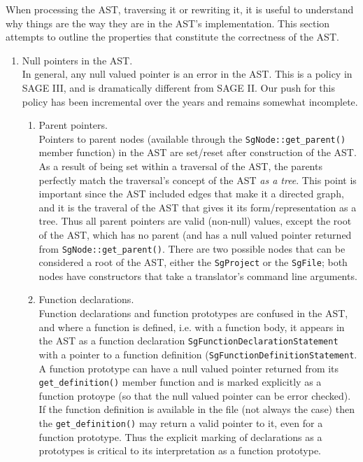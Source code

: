    When processing the AST, traversing it or rewriting it, it is useful to understand
why things are the way they are in the AST's implementation.  This section attempts to 
outline the properties that constitute the correctness of the AST.
\begin{enumerate}
     \item Null pointers in the AST. \\
          In general, any null valued pointer is an error in the AST.  This is 
          a policy in SAGE III, and is dramatically different from SAGE II.
          Our push for this policy has been incremental over the years and remains
          somewhat incomplete.
     \begin{enumerate}
          \item Parent pointers. \\
               Pointers to parent nodes (available through the {\tt SgNode::get\_parent()} member
               function) in the AST are set/reset after construction of the AST. As a
               result of being set within a traversal of the AST, the parents perfectly 
               match the traversal's concept of the AST {\em as a tree}.  This point is
               important since the AST included edges that make it a directed graph, and
               it is the traveral of the AST 
               that gives it its form/representation as a tree.  Thus all parent pointers
               are valid (non-null) values, except the root of the AST, which has no
               parent (and has a null valued pointer returned from 
               {\tt SgNode::get\_parent()}.  There are two possible nodes that can be
               considered a root of the AST, either the {\tt SgProject} or the 
               {\tt SgFile}; both nodes have constructors that take a translator's command
               line arguments.

          \item Function declarations. \\
               Function declarations and function prototypes are confused in the AST,
               and where a function is defined, i.e. with a function body, it appears 
               in the AST as a function declaration {\tt SgFunctionDeclarationStatement} 
               with a pointer to a function definition 
               ({\tt SgFunctionDefinitionStatement}. A function prototype can have a null 
               valued pointer returned from its {\tt get\_definition()} member function
               and is marked explicitly as a function protoype (so that the null valued
               pointer can be error checked). If the function definition is available
               in the file (not always the case) then the {\tt get\_definition()} may 
               return a valid pointer 
               to it, even for a function prototype. Thus the explicit marking of
               declarations as a prototypes is critical to its interpretation as a function
               prototype.


\end{enumerate}
\end{enumerate}

